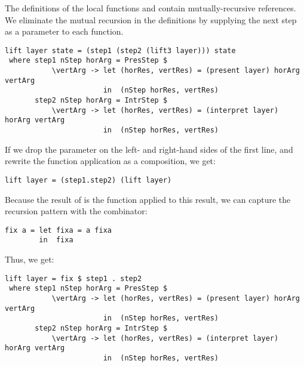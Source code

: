 The definitions of the local functions  and  contain mutually-recursive references. We eliminate the mutual recursion in the definitions by supplying the next step as a parameter to each function.

      
      
\begin{small} %
\begin{verbatim}
lift layer state = (step1 (step2 (lift3 layer))) state
 where step1 nStep horArg = PresStep $ 
           \vertArg -> let (horRes, vertRes) = (present layer) horArg vertArg                                         
                       in  (nStep horRes, vertRes)
       step2 nStep horArg = IntrStep $
           \vertArg -> let (horRes, vertRes) = (interpret layer) horArg vertArg                     
                       in  (nStep horRes, vertRes)
\end{verbatim}
\end{small}

If we drop the  parameter on the left- and right-hand sides of the first line, and rewrite the function application as a composition, we get:
\
\begin{small}
\begin{verbatim}
lift layer = (step1.step2) (lift layer)
\end{verbatim}
\end{small}

Because the result of  is the function  applied to this result, we can capture the recursion pattern with  the  combinator:

\begin{small}
\begin{verbatim}
fix a = let fixa = a fixa
        in  fixa
\end{verbatim}
\end{small}

Thus, we get:

\begin{small} %
\begin{verbatim}
lift layer = fix $ step1 . step2 
 where step1 nStep horArg = PresStep $ 
           \vertArg -> let (horRes, vertRes) = (present layer) horArg vertArg                                         
                       in  (nStep horRes, vertRes)
       step2 nStep horArg = IntrStep $
           \vertArg -> let (horRes, vertRes) = (interpret layer) horArg vertArg                     
                       in  (nStep horRes, vertRes)
\end{verbatim}
\end{small}

